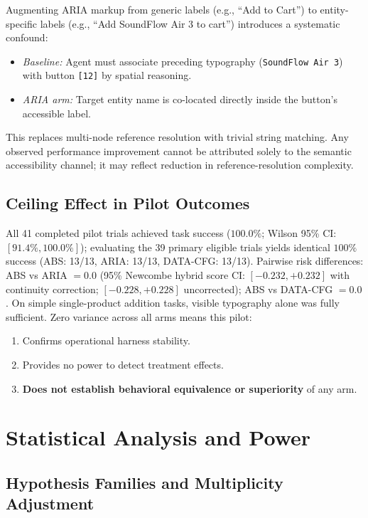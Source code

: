 \documentclass[conference]{IEEEtran}
\begin{document}
Augmenting ARIA markup from generic labels (e.g., ``Add to Cart'') to entity-specific labels (e.g., ``Add SoundFlow Air 3 to cart'') introduces a systematic confound:
\begin{itemize}
    \item \textit{Baseline:} Agent must associate preceding typography (\texttt{SoundFlow Air 3}) with button \texttt{[12]} by spatial reasoning.
    \item \textit{ARIA arm:} Target entity name is co-located directly inside the button's accessible label.
\end{itemize}
This replaces multi-node reference resolution with trivial string matching. Any observed performance improvement cannot be attributed solely to the semantic accessibility channel; it may reflect reduction in reference-resolution complexity.

\subsection{Ceiling Effect in Pilot Outcomes}

All 41 completed pilot trials achieved task success ($100.0\%$; Wilson 95\% CI: $[91.4\%, 100.0\%]$); evaluating the 39 primary eligible trials yields identical $100\%$ success (ABS: 13/13, ARIA: 13/13, DATA-CFG: 13/13). Pairwise risk differences: ABS vs ARIA $= 0.0$ (95\% Newcombe hybrid score CI: $[-0.232, +0.232]$ with continuity correction; $[-0.228, +0.228]$ uncorrected); ABS vs DATA-CFG $= 0.0$. On simple single-product addition tasks, visible typography alone was fully sufficient. Zero variance across all arms means this pilot:
\begin{enumerate}
    \item Confirms operational harness stability.
    \item Provides no power to detect treatment effects.
    \item \textbf{Does not establish behavioral equivalence or superiority} of any arm.
\end{enumerate}

\section{Statistical Analysis and Power}
\label{sec:stats}

\subsection{Hypothesis Families and Multiplicity Adjustment}
\end{document}
